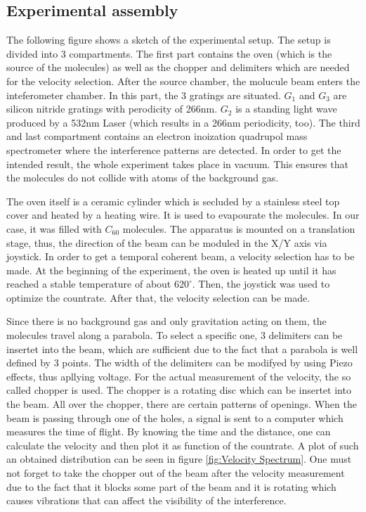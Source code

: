 \documentclass[12pt,a4paper]{article}
\begin{document}
\begin{multicols}{2}
\section{Experimental assembly}
The following figure shows a sketch of the experimental setup. The setup is divided into 3 compartments. The first part contains the oven (which is the source of the molecules) as well as the chopper and delimiters which are needed for the velocity selection. 
After the source chamber, the molucule beam enters the inteferometer chamber. In this part, the 3 gratings are situated. $G_1$ and $G_3$ are silicon nitride gratings with perodicity of 266nm. $G_2$ is a standing light wave produced by a 532nm Laser (which results in a 266nm periodicity, too).
The third and last compartment contains an electron inoization quadrupol mass spectrometer where the interference patterns are detected.
In order to get the intended result, the whole experiment takes place in vacuum. This ensures that the molecules do not collide with atoms of the background gas.

The oven itself is a ceramic cylinder which is secluded by a stainless steel top cover and heated by a heating wire. It is used to evapourate the molecules. In our case, it was filled with $C_{60}$ molecules. The apparatus is mounted on a translation stage, thus, the direction of the beam can be moduled in the X/Y axis via joystick.
In order to get a temporal coherent beam, a velocity selection has to be made. 
At the beginning of the experiment, the oven is heated up until it has reached a stable temperature of about $620^\circ$. Then, the joystick was used to optimize the countrate. After that, the velocity selection can be made.

Since there is no background gas and only gravitation acting on them, the molecules travel along a parabola. To select a specific one, 3 delimiters can be insertet into the beam, which are sufficient due to the fact that a parabola is well defined by 3 points. The width of the delimiters can be modifyed by using Piezo effects, thus apllying voltage. 
For the actual measurement of the velocity, the so called chopper is used. The chopper is a rotating disc which can be insertet into the beam. All over the chopper, there are certain patterns of openings. When the beam is passing through one of the holes, a signal is sent to a computer which measures the time of flight. By knowing the time and the distance, one can calculate the velocity and then plot it as function of the countrate. A plot of such an obtained distribution can be seen in figure \ref{fig:Velocity Spectrum}. One must not forget to take the chopper out of the beam after the velocity measurement due to the fact that it blocks some part of the beam and it is rotating which causes vibrations that can affect the visibility of the interference.


\end{multicols}
\end{document}
